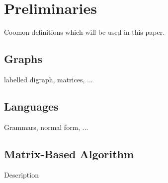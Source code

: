 \section{Preliminaries}

Coomon definitions which will be used in this paper.

\subsection{Graphs}

labelled digraph, matrices, ...

\subsection{Languages}

Grammars, normal form, ...

\subsection{Matrix-Based Algorithm}

Description